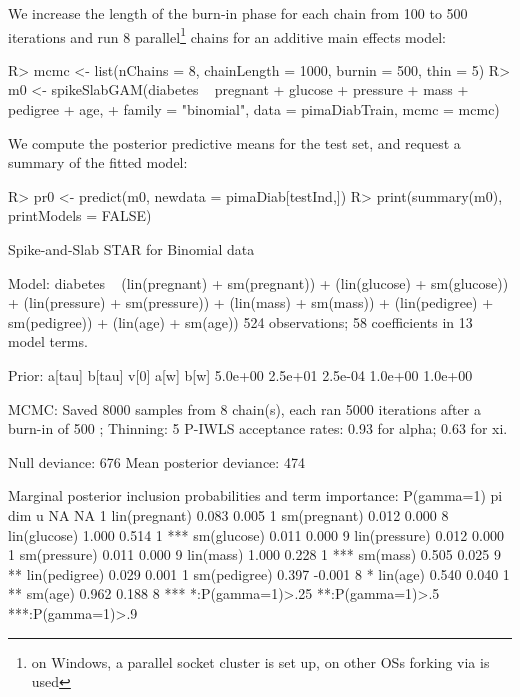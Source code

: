 \documentclass[article, shortnames, nojss, noheadings, notitle]{jss}
\begin{document}
We increase the length of the burn-in phase for each chain from 100 to 500 iterations and
run 8 parallel\footnote{on Windows, a parallel socket cluster is set up,
on other OSs forking via  is used} chains for an additive main effects model:
\begin{Schunk}
\begin{Sinput}
R> mcmc <- list(nChains = 8, chainLength = 1000, burnin = 500, thin = 5)
R> m0 <- spikeSlabGAM(diabetes ~ pregnant + glucose + pressure + mass + pedigree + age,
+          family = "binomial", data = pimaDiabTrain, mcmc = mcmc)
\end{Sinput}
\end{Schunk}
We compute the posterior predictive means for the test set, and request a summary of the fitted model:
\begin{Schunk}
\begin{Sinput}
R> pr0 <- predict(m0, newdata = pimaDiab[testInd,])
R> print(summary(m0), printModels = FALSE)
\end{Sinput}
\begin{Soutput}
Spike-and-Slab STAR for Binomial data 

Model:
diabetes ~ (lin(pregnant) + sm(pregnant)) + (lin(glucose) + sm(glucose)) + 
    (lin(pressure) + sm(pressure)) + (lin(mass) + sm(mass)) + 
    (lin(pedigree) + sm(pedigree)) + (lin(age) + sm(age))
524 observations; 58 coefficients in 13 model terms.

Prior:
 a[tau]  b[tau]    v[0]    a[w]    b[w] 
5.0e+00 2.5e+01 2.5e-04 1.0e+00 1.0e+00 

MCMC:
Saved 8000 samples from 8 chain(s), each ran 5000 iterations after a
  burn-in of 500 ; Thinning: 5
P-IWLS acceptance rates: 0.93 for alpha; 0.63 for xi.
                            
Null deviance:           676
Mean posterior deviance: 474

Marginal posterior inclusion probabilities and term importance:
              P(gamma=1)     pi dim    
u                     NA     NA   1    
lin(pregnant)      0.083  0.005   1    
sm(pregnant)       0.012  0.000   8    
lin(glucose)       1.000  0.514   1 ***
sm(glucose)        0.011  0.000   9    
lin(pressure)      0.012  0.000   1    
sm(pressure)       0.011  0.000   9    
lin(mass)          1.000  0.228   1 ***
sm(mass)           0.505  0.025   9  **
lin(pedigree)      0.029  0.001   1    
sm(pedigree)       0.397 -0.001   8   *
lin(age)           0.540  0.040   1  **
sm(age)            0.962  0.188   8 ***
*:P(gamma=1)>.25 **:P(gamma=1)>.5 ***:P(gamma=1)>.9
\end{Soutput}
\end{Schunk}
\end{document}
